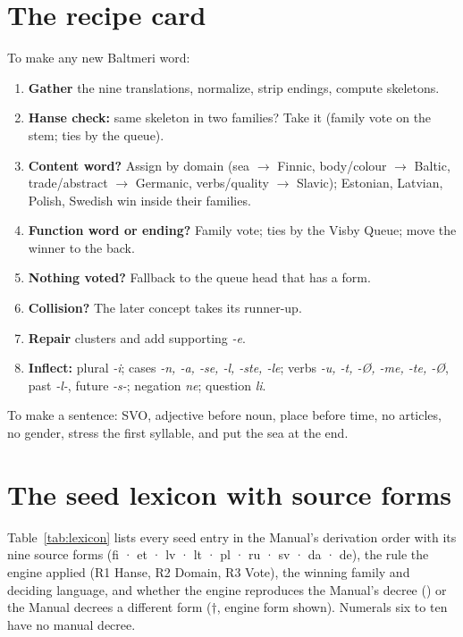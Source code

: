 \appendix
\section{The recipe card}\label{app:recipe}
To make any new Baltmeri word:
\begin{enumerate}\setlength{\itemsep}{1pt}
\item \textbf{Gather} the nine translations, normalize, strip endings, compute skeletons.
\item \textbf{Hanse check:} same skeleton in two families? Take it (family vote on the stem; ties by the queue).
\item \textbf{Content word?} Assign by domain (sea $\rightarrow$ Finnic, body/colour $\rightarrow$ Baltic, trade/abstract $\rightarrow$ Germanic, verbs/quality $\rightarrow$ Slavic); Estonian, Latvian, Polish, Swedish win inside their families.
\item \textbf{Function word or ending?} Family vote; ties by the Visby Queue; move the winner to the back.
\item \textbf{Nothing voted?} Fallback to the queue head that has a form.
\item \textbf{Collision?} The later concept takes its runner-up.
\item \textbf{Repair} clusters and add supporting \emph{-e}.
\item \textbf{Inflect:} plural \emph{-i}; cases \emph{-n, -a, -se, -l, -ste, -le}; verbs \emph{-u, -t, -Ø, -me, -te, -Ø}, past \emph{-l-}, future \emph{-s-}; negation \emph{ne}; question \emph{li}.
\end{enumerate}
To make a sentence: SVO, adjective before noun, place before time, no articles, no gender, stress the first syllable, and put the sea at the end.

\section{The seed lexicon with source forms}\label{app:lexicon}
Table~\ref{tab:lexicon} lists every seed entry in the Manual's derivation order with its nine source forms (fi · et · lv · lt · pl · ru · sv · da · de), the rule the engine applied (R1 Hanse, R2 Domain, R3 Vote), the winning family and deciding language, and whether the engine reproduces the Manual's decree (\checkmark) or the Manual decrees a different form ($\dagger$, engine form shown). Numerals six to ten have no manual decree.

\begin{table}[p]
\centering\scriptsize
\caption{The seed lexicon.}
\label{tab:lexicon}

\end{table}

